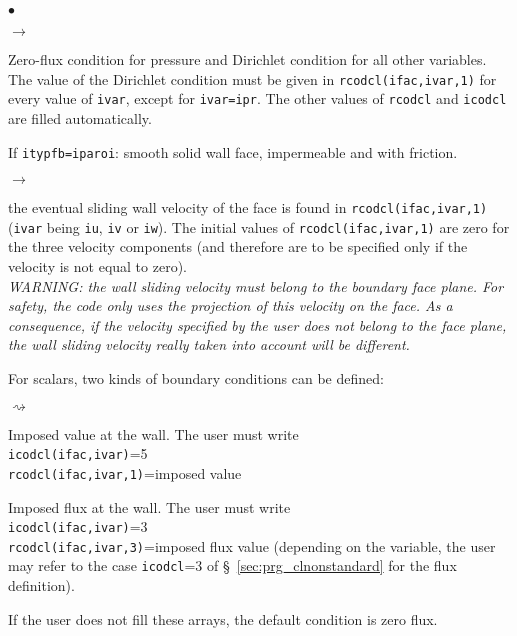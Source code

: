 {{{\begin{list}{$\bullet$}{}
\begin{list}{$\rightarrow$}{}
\item Zero-flux condition for pressure and Dirichlet condition for all
      other variables. The value of the Dirichlet condition must be given in
      \texttt{rcodcl(ifac,ivar,1)} for every value of \texttt{ivar}, except for
      \texttt{ivar=ipr}. The other values of \texttt{rcodcl} and
      \texttt{icodcl} are filled automatically.
\end{list}

\item If \texttt{itypfb=iparoi}: smooth solid wall face, impermeable and with friction.

\begin{list}{$\rightarrow$}{}
\item the eventual sliding wall velocity of the face is
      found in \texttt{rcodcl(ifac,ivar,1)} (\texttt{ivar} being
      \texttt{iu}, \texttt{iv} or \texttt{iw}). The initial
      values of \texttt{rcodcl(ifac,ivar,1)} are zero for
      the three velocity components (and therefore are to be specified
      only if the velocity is not equal to zero). \\
{\em WARNING: the wall sliding velocity must belong to the boundary face
      plane. For safety, the code only uses the projection of this
      velocity on the face. As a consequence, if the velocity specified
      by the user does not belong to the face plane, the wall sliding velocity really
      taken into account will be different.}

\item For scalars, two kinds of boundary conditions can be
      defined:
\begin{list}{$\rightsquigarrow$}{}
\item Imposed value at the wall. The user must write\\
\hspace*{1cm}\texttt{icodcl(ifac,ivar)}=5\\
\hspace*{1cm}\texttt{rcodcl(ifac,ivar,1)}=imposed value\\
\item Imposed flux at the wall. The user must write\\
\hspace*{1cm}\texttt{icodcl(ifac,ivar)}=3\\
\hspace*{1cm}\texttt{rcodcl(ifac,ivar,3)}=imposed flux value (depending on the
variable, the user may refer to the case \texttt{icodcl}=3 of \S~\ref{sec:prg_clnonstandard} for the flux definition).
\item If the user does not fill these arrays, the default condition
      is zero flux.
\end{list}
\end{list}


\end{list}}}}
